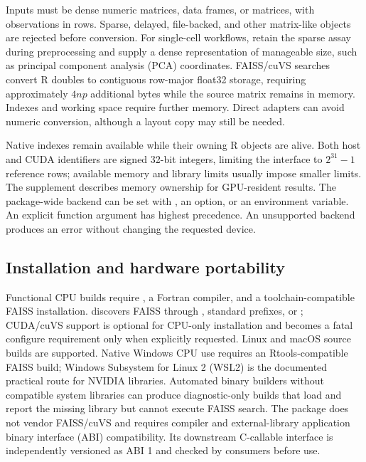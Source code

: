 \documentclass[article]{jss}
\newcommand{\fct}[1]{\code{#1()}}
\begin{document}
Inputs must be dense numeric matrices, data frames, or  matrices,
with observations in rows. Sparse, delayed, file-backed, and other matrix-like
objects are rejected before conversion. For single-cell workflows, retain
the sparse assay during preprocessing and supply a dense representation of
manageable size, such as principal component analysis (PCA) coordinates.
FAISS/cuVS searches convert R doubles to contiguous row-major float32 storage,
requiring approximately $4np$ additional bytes while the source matrix remains
in memory. Indexes and working space require further memory. Direct
 adapters can avoid numeric conversion, although a layout copy
may still be needed.

Native indexes remain available while their owning R objects are alive.
Both host and CUDA identifiers are signed 32-bit integers, limiting the
interface to $2^{31}-1$ reference rows;
available memory and library limits usually impose smaller limits.
The supplement describes memory ownership for GPU-resident results.
The package-wide backend can be set with \fct{faissR\_backend}, an
 option, or an environment variable. An explicit function argument
has highest precedence. An unsupported backend produces an error without
changing the requested device.

\subsection{Installation and hardware portability}

Functional CPU builds require , a Fortran compiler, and a
toolchain-compatible FAISS installation.  discovers FAISS through
, standard prefixes, or ; CUDA/cuVS support
is optional for CPU-only installation and becomes a fatal configure requirement
only when explicitly requested. Linux and macOS source builds are supported.
Native Windows CPU use requires an Rtools-compatible FAISS build; Windows
Subsystem for Linux 2 (WSL2) is the
documented practical route for NVIDIA libraries. Automated binary builders
without compatible system libraries can produce diagnostic-only builds that
load and report the missing library but cannot execute FAISS search.
The package does not vendor FAISS/cuVS and requires compiler and external-library
application binary interface (ABI) compatibility. Its downstream C-callable
interface is independently versioned as ABI 1 and checked by consumers before
use.
\end{document}
